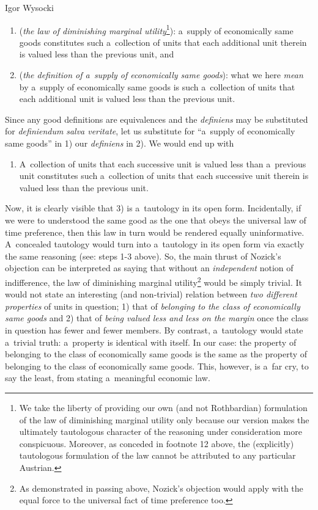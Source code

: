 \begin{artengenv}{Igor Wysocki}
\begin{enumerate}[label=\arabic*), ref=\arabic*]
\item (\textit{the law of diminishing marginal utility}\footnote{We take the liberty of providing our own (and not Rothbardian) formulation of the law of diminishing marginal utility only because our version makes the ultimately tautologous character of the reasoning under consideration more conspicuous. Moreover, as conceded in footnote 12 above, the (explicitly) tautologous formulation of the law cannot be attributed to any particular Austrian.}): a~supply of economically same goods constitutes such a~collection of units that each additional unit therein is valued less than the previous unit, and
\item (\textit{the definition of a~supply of economically same goods}): what we here \textit{mean} by a~supply of economically same goods is such a~collection of units that each additional unit is valued less than the previous unit.
\end{enumerate}
Since any good definitions are equivalences and the \textit{definiens} may be substituted for \textit{definiendum} \textit{salva veritate}, let us substitute for ``a~supply of economically same goods'' in 1) our \textit{definiens} in 2). We would end up with

\begin{enumerate}[resume, label=\arabic*), ref=\arabic*]
\item A~collection of units that each successive unit is valued less than a~previous unit constitutes such a~collection of units that each successive unit therein is valued less than the previous unit.
\end{enumerate}
Now, it is clearly visible that 3) is a~tautology in its open form. Incidentally, if we were to understood the same good as the one that obeys the universal law of time preference, then this law in turn would be rendered equally uninformative. A~concealed tautology would turn into a~tautology in its open form via exactly the same reasoning (see: steps 1-3 above). So, the main thrust of Nozick's objection can be interpreted as saying that without an \textit{independent} notion of indifference, the law of diminishing marginal utility\footnote{As demonstrated in passing above, Nozick's objection would apply with the equal force to the universal fact of time preference too.} would be simply trivial. It would not state an interesting (and non-trivial) relation between \textit{two different properties} of units in question; 1) that of \textit{belonging to the class of economically same goods} and 2) that of \textit{being valued less and less on the margin} once the class in question has fewer and fewer members. By contrast, a~tautology would state a~trivial truth: a~property is identical with itself. In our case: the property of belonging to the class of economically same goods is the same as the property of belonging to the class of economically same goods. This, however, is a~far cry, to say the least, from stating a~meaningful economic law.


\end{artengenv}
